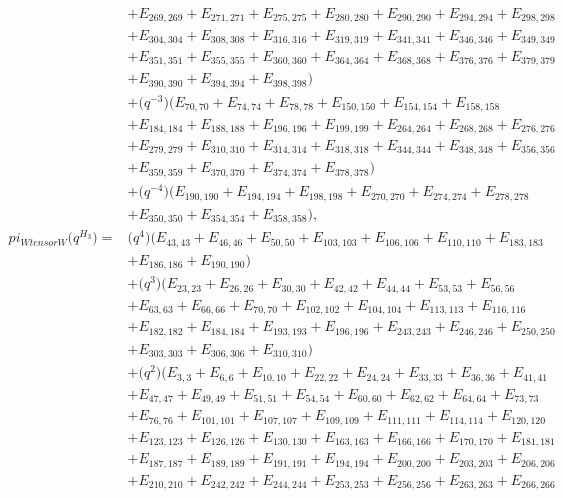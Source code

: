 \documentclass[10pt,a4paper]{amsart}
\numberwithin{equation}{section}
\theoremstyle{definition}
\def\pi{pi}
\def\otimes{ tensor }
\begin{document}
\begin{align*}
&+E_{269,269}+E_{271,271}+E_{275,275}+E_{280,280}+E_{290,290}+E_{294,294}+E_{298,298}\\
&+E_{304,304}+E_{308,308}+E_{316,316}+E_{319,319}+E_{341,341}+E_{346,346}+E_{349,349}\\
&+E_{351,351}+E_{355,355}+E_{360,360}+E_{364,364}+E_{368,368}+E_{376,376}+E_{379,379}\\
&+E_{390,390}+E_{394,394}+E_{398,398})\\
&+\bigl(q^{-3}\bigr)(E_{70,70}+E_{74,74}+E_{78,78}+E_{150,150}+E_{154,154}+E_{158,158}\\
&+E_{184,184}+E_{188,188}+E_{196,196}+E_{199,199}+E_{264,264}+E_{268,268}+E_{276,276}\\
&+E_{279,279}+E_{310,310}+E_{314,314}+E_{318,318}+E_{344,344}+E_{348,348}+E_{356,356}\\
&+E_{359,359}+E_{370,370}+E_{374,374}+E_{378,378})\\
&+\bigl(q^{-4}\bigr)(E_{190,190}+E_{194,194}+E_{198,198}+E_{270,270}+E_{274,274}+E_{278,278}\\
&+E_{350,350}+E_{354,354}+E_{358,358}),
\\
 \pi_{W \otimes W}\bigl(q^{H_3}\bigr) ={}&
\bigl(q^4\bigr)(E_{43,43}+E_{46,46}+E_{50,50}+E_{103,103}+E_{106,106}+E_{110,110}+E_{183,183}\\
&+E_{186,186}+E_{190,190})\\
&+\bigl(q^3\bigr)(E_{23,23}+E_{26,26}+E_{30,30}+E_{42,42}+E_{44,44}+E_{53,53}+E_{56,56}\\
&+E_{63,63}+E_{66,66}+E_{70,70}+E_{102,102}+E_{104,104}+E_{113,113}+E_{116,116}\\
&+E_{182,182}+E_{184,184}+E_{193,193}+E_{196,196}+E_{243,243}+E_{246,246}+E_{250,250}\\
&+E_{303,303}+E_{306,306}+E_{310,310})\\
&+\bigl(q^2\bigr)(E_{3,3}+E_{6,6}+E_{10,10}+E_{22,22}+E_{24,24}+E_{33,33}+E_{36,36}+E_{41,41}\\
&+E_{47,47}+E_{49,49}+E_{51,51}+E_{54,54}+E_{60,60}+E_{62,62}+E_{64,64}+E_{73,73}\\
&+E_{76,76}+E_{101,101}+E_{107,107}+E_{109,109}+E_{111,111}+E_{114,114}+E_{120,120}\\
&+E_{123,123}+E_{126,126}+E_{130,130}+E_{163,163}+E_{166,166}+E_{170,170}+E_{181,181}\\
&+E_{187,187}+E_{189,189}+E_{191,191}+E_{194,194}+E_{200,200}+E_{203,203}+E_{206,206}\\
&+E_{210,210}+E_{242,242}+E_{244,244}+E_{253,253}+E_{256,256}+E_{263,263}+E_{266,266}\\

\end{align*}
\end{document}
